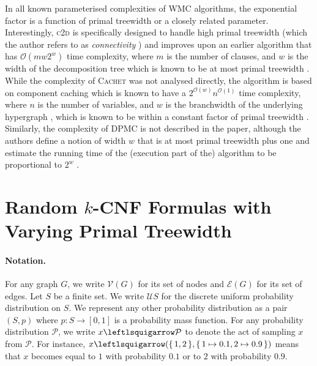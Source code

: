 In all known parameterised complexities of \textsf{WMC} algorithms, the
exponential factor is a function of primal treewidth or a closely related
parameter. Interestingly, \textsc{c2d} is specifically designed to handle high
primal treewidth (which the author refers to as
\emph{connectivity} \citep{DBLP:conf/ijcai/Darwiche99}) and improves upon an
earlier algorithm that has $\mathcal{O}(mw2^w)$ time complexity, where $m$ is
the number of clauses, and $w$ is the width of the decomposition tree which is
known to be at most primal
treewidth \citep{DBLP:journals/jacm/Darwiche01,DBLP:conf/ecai/Darwiche04}. While
the complexity of \textsc{Cachet} was not analysed directly, the algorithm is
based on component caching which is known to have a
$2^{\mathcal{O}(w)}n^{\mathcal{O}(1)}$ time complexity, where $n$ is the number
of variables, and $w$ is the branchwidth of the underlying
hypergraph \citep{DBLP:journals/jair/BacchusDP09,DBLP:conf/sat/SangBBKP04}, which
is known to be within a constant factor of primal
treewidth \citep{DBLP:journals/jct/RobertsonS91}. Similarly, the complexity of
\textsf{DPMC} is not described in the paper, although the authors define a
notion of width $w$ that is at most primal treewidth plus one and estimate the
running time of the (execution part of the) algorithm to be proportional to
$2^w$ \citep{DBLP:conf/cp/DudekPV20}.

\section{Random $k$-CNF Formulas with Varying Primal
  Treewidth}\label{sec:model}

\paragraph{Notation.}
For any graph $G$, we write $\mathcal{V}(G)$ for its set of nodes and
$\mathcal{E}(G)$ for its set of edges. Let $S$ be a finite set. We write
$\mathcal{U}S$ for the discrete uniform probability distribution on $S$. We
represent any other probability distribution as a pair $(S, p)$ where $p\colon S
\to [0, 1]$ is a probability mass function. For any probability distribution
$\mathcal{P}$, we write $x \leftlsquigarrow \mathcal{P}$ to denote the act of
sampling $x$ from $\mathcal{P}$. For instance, $x \leftlsquigarrow (\{\, 1, 2 \,\}, \{\, 1 \mapsto 0.1, 2 \mapsto 0.9 \,\})$ means that $x$ becomes equal to $1$ with probability $0.1$ or to $2$ with probability $0.9$.


